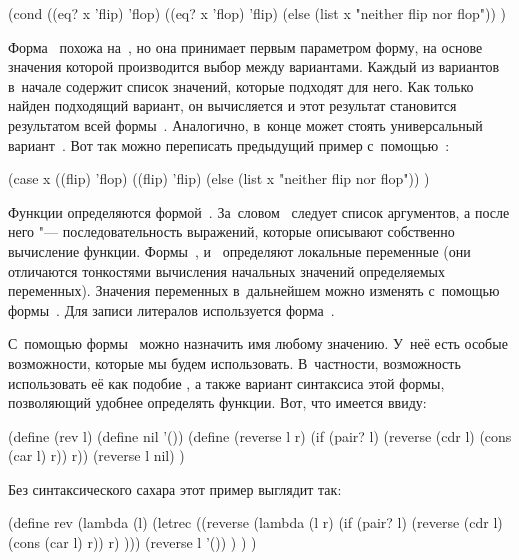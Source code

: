\begin{code:lisp}
(cond ((eq? x 'flip) 'flop)
      ((eq? x 'flop) 'flip)
      (else (list x "neither flip nor flop")) )
\end{code:lisp}

Форма~ похожа на~, но она принимает первым параметром форму,
на основе значения которой производится выбор между вариантами. Каждый из
вариантов в~начале содержит список значений, которые подходят для него. Как
только найден подходящий вариант, он вычисляется и этот результат становится
результатом всей формы~. Аналогично, в~конце может стоять универсальный
вариант~. Вот так можно переписать предыдущий пример
с~помощью~:

\begin{code:lisp}
(case x
  ((flip) 'flop)
  ((flip) 'flip)
  (else (list x "neither flip nor flop")) )
\end{code:lisp}

Функции определяются формой~. За~словом~ следует список
аргументов, а после него "--- последовательность выражений, которые описывают
собственно вычисление функции. Формы~,  и~
определяют локальные переменные (они отличаются тонкостями вычисления начальных
значений определяемых переменных). Значения переменных в~дальнейшем можно
изменять с~помощью формы~. Для записи литералов используется
форма~.

С~помощью формы~ можно назначить имя любому значению. У~неё есть
особые возможности, которые мы будем использовать. В~частности, возможность
использовать её как подобие , а также вариант синтаксиса этой формы,
позволяющий удобнее определять функции. Вот, что имеется ввиду:

\begin{code:lisp}
(define (rev l)
  (define nil '())
  (define (reverse l r)
    (if (pair? l) (reverse (cdr l) (cons (car l) r)) r))
  (reverse l nil) )
\end{code:lisp}

\noindent Без синтаксического сахара этот пример выглядит так:

\begin{code:lisp}
(define rev
  (lambda (l)
    (letrec ((reverse (lambda (l r)
                        (if (pair? l) (reverse (cdr l)
                                               (cons (car l) r))
                            r) )))
      (reverse l '()) ) ) )
\end{code:lisp}

